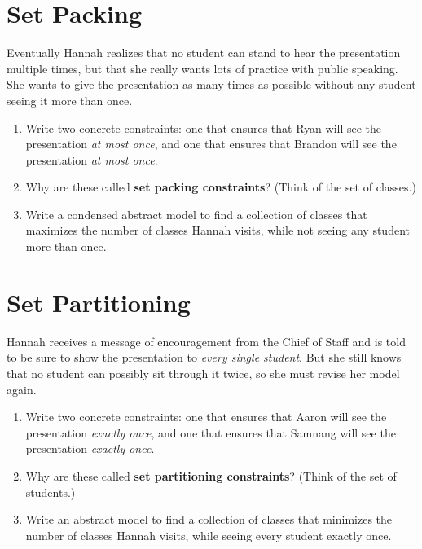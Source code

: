 \documentclass[11pt]{article}
\theoremstyle{definition}
\begin{document}
\newpage
\section{Set Packing}
Eventually Hannah realizes that no student can stand to hear the presentation multiple times, but that she really wants lots of practice with public speaking.  She wants to give the presentation as many times as possible without any student seeing it more than once.
\begin{enumerate}

\item Write two concrete constraints:  one that ensures that Ryan will see the presentation \emph{at most once}, and one that ensures that Brandon will see the presentation \emph{at most once}.

\vspace{2in}

\item Why are these called {\bf set packing constraints}?  (Think of the set of classes.)
\vspace{0.5in}
\item  Write a condensed abstract model to find a collection of classes that maximizes the number of classes Hannah visits, while not seeing any student more than once. 
\vfill
\vfill
\end{enumerate}

\newpage
\section{Set Partitioning}
Hannah receives a message of encouragement from the Chief of Staff and is told to be sure to show the presentation to \emph{every single student}.  But she still knows that no student can possibly sit through it twice, so she must revise her model again.  
\begin{enumerate}
\item Write two concrete constraints:  one that ensures that Aaron will see the presentation \emph{exactly once}, and one that ensures that Samnang will see the presentation \emph{exactly once}.

\vspace{2in}

\item Why are these called {\bf set partitioning constraints}?  (Think of the set of students.) \vspace{0.5in}
\item  Write an abstract model to find a collection of classes that minimizes the number of classes Hannah visits, while seeing every student exactly once. 

\end{enumerate}
\end{document}
